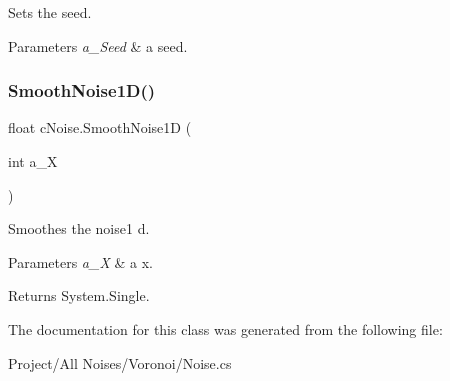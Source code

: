 Sets the seed. 


\begin{DoxyParams}{Parameters}
{\em a\+\_\+\+Seed} & a seed.\\
\hline
\end{DoxyParams}
\mbox{\label{classc_noise_ae4539eab0205aa7bacf824005c0307c5}} 
\subsubsection{\texorpdfstring{Smooth\+Noise1\+D()}{SmoothNoise1D()}}
{\footnotesize\ttfamily float c\+Noise.\+Smooth\+Noise1D (\begin{DoxyParamCaption}\item[{int}]{a\+\_\+X }\end{DoxyParamCaption})\hspace{0.3cm}{\ttfamily [inline]}}



Smoothes the noise1 d. 


\begin{DoxyParams}{Parameters}
{\em a\+\_\+X} & a x.\\
\hline
\end{DoxyParams}
\begin{DoxyReturn}{Returns}
System.\+Single.
\end{DoxyReturn}


The documentation for this class was generated from the following file\+:\begin{DoxyCompactItemize}
\item 
Project/\+All Noises/\+Voronoi/Noise.\+cs\end{DoxyCompactItemize}
